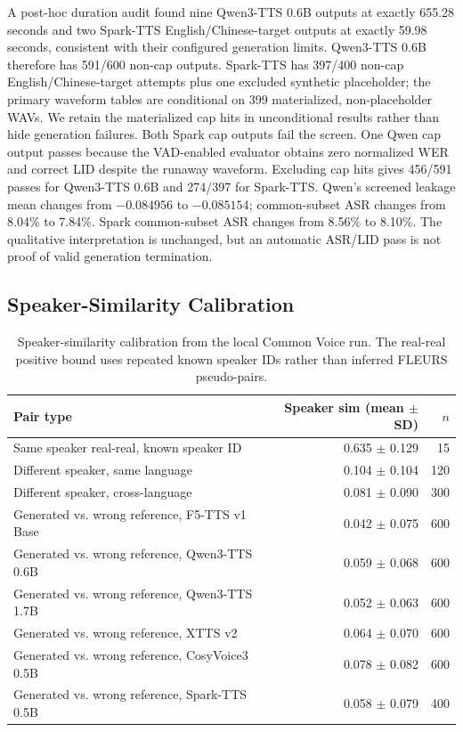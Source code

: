 \documentclass[11pt]{article}
\begin{document}
A post-hoc duration audit found nine Qwen3-TTS 0.6B outputs at exactly 655.28 seconds and two Spark-TTS English/Chinese-target outputs at exactly 59.98 seconds, consistent with their configured generation limits. Qwen3-TTS 0.6B therefore has 591/600 non-cap outputs. Spark-TTS has 397/400 non-cap English/Chinese-target attempts plus one excluded synthetic placeholder; the primary waveform tables are conditional on 399 materialized, non-placeholder WAVs. We retain the materialized cap hits in unconditional results rather than hide generation failures. Both Spark cap outputs fail the screen. One Qwen cap output passes because the VAD-enabled evaluator obtains zero normalized WER and correct LID despite the runaway waveform. Excluding cap hits gives 456/591 passes for Qwen3-TTS 0.6B and 274/397 for Spark-TTS. Qwen's screened leakage mean changes from $-0.084956$ to $-0.085154$; common-subset ASR changes from 8.04\% to 7.84\%. Spark common-subset ASR changes from 8.56\% to 8.10\%. The qualitative interpretation is unchanged, but an automatic ASR/LID pass is not proof of valid generation termination.

\subsection{Speaker-Similarity Calibration}

\begin{table}[t]
\centering
\caption{Speaker-similarity calibration from the local Common Voice run. The real-real positive bound uses repeated known speaker IDs rather than inferred FLEURS pseudo-pairs.}
\label{tab:spk_calibration}
\begin{tabular}{lrr}
\toprule
Pair type & Speaker sim (mean $\pm$ SD) & $n$ \\
\midrule
Same speaker real-real, known speaker ID & 0.635 $\pm$ 0.129 & 15 \\
Different speaker, same language & 0.104 $\pm$ 0.104 & 120 \\
Different speaker, cross-language & 0.081 $\pm$ 0.090 & 300 \\
Generated vs. wrong reference, F5-TTS v1 Base & 0.042 $\pm$ 0.075 & 600 \\
Generated vs. wrong reference, Qwen3-TTS 0.6B & 0.059 $\pm$ 0.068 & 600 \\
Generated vs. wrong reference, Qwen3-TTS 1.7B & 0.052 $\pm$ 0.063 & 600 \\
Generated vs. wrong reference, XTTS v2 & 0.064 $\pm$ 0.070 & 600 \\
Generated vs. wrong reference, CosyVoice3 0.5B & 0.078 $\pm$ 0.082 & 600 \\
Generated vs. wrong reference, Spark-TTS 0.5B & 0.058 $\pm$ 0.079 & 400 \\
\bottomrule
\end{tabular}
\end{table}
\end{document}
